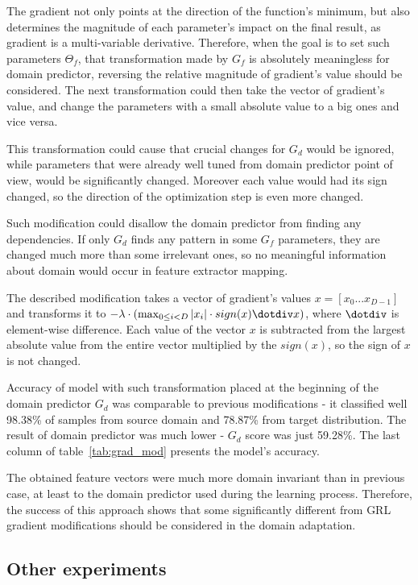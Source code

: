\documentclass{article}
\begin{document}
The gradient not only points at the direction of the function's minimum, but also determines the magnitude of each parameter's impact on the final result, as gradient is a multi-variable derivative. Therefore, when the goal is to set such parameters $\Theta_{f}$, that transformation made by $G_{f}$ is absolutely meaningless for domain predictor, reversing the relative magnitude of gradient's value should be considered. The next transformation could then take the vector of gradient's value, and change the parameters with a small absolute value to a big ones and vice versa. 
\par
This transformation could cause that crucial changes for $G_{d}$ would be ignored, while parameters that were already well tuned from domain predictor point of view, would be significantly changed. Moreover each value would had its sign changed, so the direction of the optimization step is even more changed.
\par
Such modification could disallow the domain predictor from finding any dependencies. If only $G_{d}$ finds any pattern in some $G_{f}$ parameters, they are changed much more than some irrelevant ones, so no meaningful information about domain would occur in feature extractor mapping. 
\par
The described modification takes a vector of gradient's values $x = [x_{0}...x_{D-1}]$ and transforms it to $-\lambda \cdot (\max_{0 \leq i < D} |x_{i}| \cdot sign(x) \dotdiv x)$, where $\dotdiv$ is element-wise difference. Each value of the vector $x$ is subtracted from the largest absolute value from the entire vector multiplied by the $sign(x)$, so the sign of $x$ is not changed.
\par
Accuracy of model with such transformation placed at the beginning of the domain predictor $G_{d}$ was comparable to previous modifications - it classified well 98.38\% of samples from source domain and 78.87\% from target distribution. The result of domain predictor was much lower - $G_{d}$ score was just 59.28\%. The last column of table~\ref{tab:grad_mod} presents the model's accuracy.
\par
The obtained feature vectors were much more domain invariant than in previous case, at least to the domain predictor used during the learning process. Therefore, the success of this approach shows that some significantly different from GRL gradient modifications should be considered in the domain adaptation.

\subsection{Other experiments}
\end{document}
